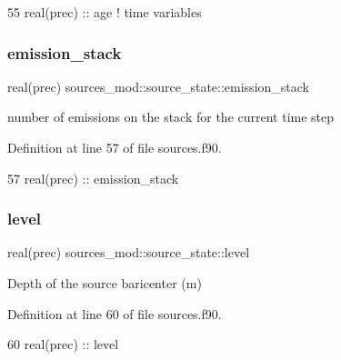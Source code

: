 \begin{DoxyCode}
55         \textcolor{keywordtype}{real(prec)} :: age              \textcolor{comment}{! time variables}
\end{DoxyCode}
\mbox{\label{structsources__mod_1_1source__state_a8c705a419fbe999e624ac42ae586700a}} 
\subsubsection{\texorpdfstring{emission\+\_\+stack}{emission\_stack}}
{\footnotesize\ttfamily real(prec) sources\+\_\+mod\+::source\+\_\+state\+::emission\+\_\+stack\hspace{0.3cm}{\ttfamily [private]}}



number of emissions on the stack for the current time step 



Definition at line 57 of file sources.\+f90.


\begin{DoxyCode}
57         \textcolor{keywordtype}{real(prec)} :: emission\_stack
\end{DoxyCode}
\mbox{\label{structsources__mod_1_1source__state_a0dde0c4e9fd145055b0861168120e4c9}} 
\subsubsection{\texorpdfstring{level}{level}}
{\footnotesize\ttfamily real(prec) sources\+\_\+mod\+::source\+\_\+state\+::level\hspace{0.3cm}{\ttfamily [private]}}



Depth of the source baricenter (m) 



Definition at line 60 of file sources.\+f90.


\begin{DoxyCode}
60         \textcolor{keywordtype}{real(prec)} :: level
\end{DoxyCode}
\mbox{\label{structsources__mod_1_1source__state_a8dacf7040158bb5214f66476bf1a1c3d}} 
